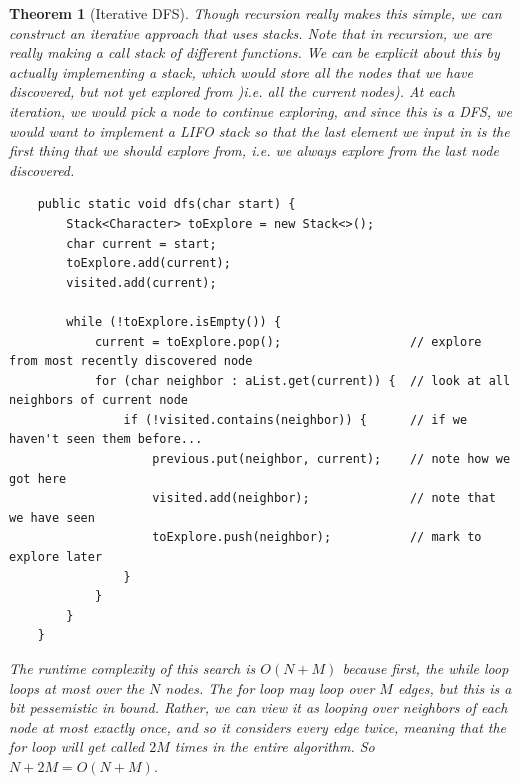 \documentclass{article}
\newtheorem{theorem}{Theorem}[section]
\theoremstyle{definition}
\theoremstyle{remark}
\theoremstyle{definition}
\begin{document}
\begin{theorem}[Iterative DFS]
Though recursion really makes this simple, we can construct an iterative approach that uses stacks. Note that in recursion, we are really making a call stack of different functions. We can be explicit about this by actually implementing a stack, which would store all the nodes that we have discovered, but not yet explored from )i.e. all the current nodes). At each iteration, we would pick a node to continue exploring, and since this is a DFS, we would want to implement a LIFO stack so that the last element we input in is the first thing that we should explore from, i.e. we always explore from the last node discovered. 
\begin{verbatim}
    public static void dfs(char start) {
        Stack<Character> toExplore = new Stack<>(); 
        char current = start; 
        toExplore.add(current); 
        visited.add(current); 
        
        while (!toExplore.isEmpty()) {
            current = toExplore.pop();                  // explore from most recently discovered node
            for (char neighbor : aList.get(current)) {  // look at all neighbors of current node 
                if (!visited.contains(neighbor)) {      // if we haven't seen them before...
                    previous.put(neighbor, current);    // note how we got here 
                    visited.add(neighbor);              // note that we have seen
                    toExplore.push(neighbor);           // mark to explore later
                }
            }
        }
    }
\end{verbatim}
The runtime complexity of this search is $O(N + M)$ because first, the while loop loops at most over the $N$ nodes. The for loop may loop over $M$ edges, but this is a bit pessemistic in bound. Rather, we can view it as looping over neighbors of each node at most exactly once, and so it considers every edge twice, meaning that the for loop will get called $2M$ times in the entire algorithm. So $N + 2M = O(N + M)$. 
\end{theorem}
\end{document}
